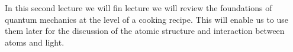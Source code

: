In this second lecture we will fin lecture we will review the foundations of quantum mechanics at the level of a cooking recipe. This will enable us to use them later for the discussion of the atomic structure and interaction between atoms and light.
